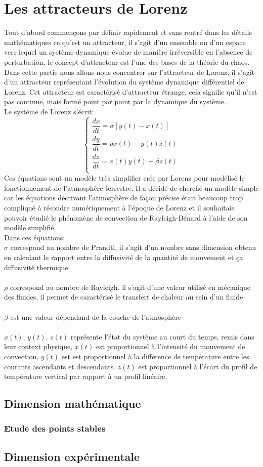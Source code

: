 \chapter{Les attracteurs de Lorenz}
Tout d’abord commençons par définir rapidement et sans rentré dans les détails mathématiques ce qu’est un attracteur,
 il s’agit d’un ensemble ou d’un espace vers lequel un système dynamique évolue de manière
 irréversible en l’absence de perturbation, le concept d’attracteur est l’une des bases de la théorie du chaos. 
 Dans cette partie nous allons nous concentrer sur l’attracteur de Lorenz, il s’agit d’un attracteur
représentant l’évolution du système dynamique différentiel de Lorenz. Cet attracteur est caractérisé d'attracteur étrange, cela signifie qu'il n'est pas continue, mais formé point par point par la dynamique du système.\\

Le système de Lorenz s'écrit: 
\[
    \left\{
    \begin{array}{rcl}
        \dfrac{dx}{dt}=\sigma[y(t)-x(t)]\\
        \dfrac{dy}{dt}=\rho x(t)-y(t)z(t)\\
        \dfrac{dz}{dt}=x(t)y(t)-\beta z(t)\\
    \end{array}
    \right.
\]
Ces équations sont un modèle très simplifier crée par Lorenz pour modélisé le fonctionnement 
de l’atmosphère terrestre. Il a décidé de cherché un modèle simple car 
les équations décrivant l’atmosphère de façon précise était beaucoup trop compliqué à résoudre
 numériquement à l’époque de Lorenz et il souhaitais pouvoir étudié  le phénomène de convection
de Rayleigh-Bénard à l’aide de son modèle simplifié.\\


Dans ces équations: \\
$\sigma$  correspond au nombre de Prandtl, il s'agit d'un nombre sans dimension obtenu en calculant le rapport entre la diffusivité de la quantité de mouvement et ça diffusivité thermique.\\\\
$\rho$    correspond au nombre de Rayleigh, il s'agit d'une valeur utilisé en mécanique des fluides, il permet de caractérisé le transfert de chaleur au sein d'un fluide \\\\
$\beta $  est une valeur dépendand de la couche de l'atmosphère\\\\
$x(t)$, $y(t)$, $z(t)$ représente l'état du système au court du temps, remis dans leur context physique, $x(t)$ est proportionnel à l'intensité du mouvement de convection, $y(t)$ est est proportionnel à la différence de température entre les courants ascendants et descendants. $z(t)$ est proportionnel à l'écart du profil de température vertical par rapport à un profil linéaire.    

\section{Dimension mathématique}
\subsection{Etude des points stables}
\section{Dimension expérimentale}